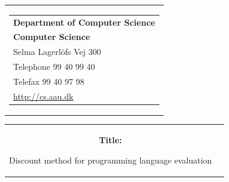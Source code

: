 \thispagestyle{empty}
\begin{titlepage}
\begin{nopagebreak}
{\samepage 
\begin{tabular}{r}
\parbox{\textwidth}{  
\hfill \parbox{5.9cm}{\begin{tabular}{l}
{\sf\small \textbf{Department of Computer Science}}\\
{\sf\small  \textbf{Computer Science}} \\
{\sf\small Selma Lagerl\"{o}fs Vej 300} \\
{\sf\small Telephone 99 40 99 40} \\
{\sf\small Telefax 99 40 97 98} \\
{\sf\small \url{http://cs.aau.dk}}
\end{tabular}}}
\\
\end{tabular}

\begin{tabular}{cc}
\parbox{7cm}{
\begin{description}

\item {\bf Title:} 

Discount method for programming language evaluation

\end{description}

\parbox{8cm}{

}}
\end{tabular}}
\end{nopagebreak}
\end{titlepage}

